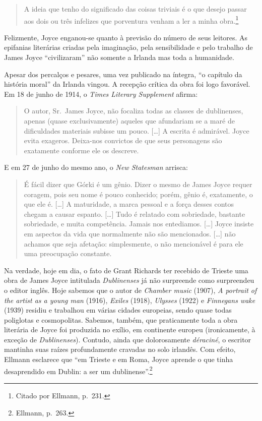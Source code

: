 \begin{quote}
A ideia que tenho do significado
das coisas triviais é o que desejo passar aos dois ou três infelizes que
porventura venham a ler a minha obra.\footnote{ Citado por Ellmann, p.~231.}
\end{quote}

Felizmente, Joyce enganou-se quanto à previsão do número de seus leitores. As
epifanias literárias criadas pela imaginação, pela sensibilidade e pelo
trabalho de James Joyce “civilizaram” não somente a Irlanda mas toda a
humanidade.

Apesar dos percalços e pesares, uma vez publicado na íntegra, “o capítulo da
história moral” da Irlanda vingou. A recepção crítica da obra foi logo
favorável.  Em 18 de junho de 1914, o \textit{Times Literary Supplement}
afirma:

\begin{quote}
O autor, Sr.~James Joyce, não focaliza todas as classes de dublinenses, apenas
(quase exclusivamente) aqueles que afundariam se a maré de dificuldades
materiais subisse um pouco. [\ldots{}] A escrita é admirável. Joyce evita exageros.
Deixa-nos convictos de que seus personagens são exatamente conforme ele os
descreve.
\end{quote}

E em 27 de junho do mesmo ano, o \textit{New Statesman} arrisca:

\begin{quote}
É fácil dizer que Górki é um gênio. Dizer o mesmo de James Joyce requer coragem,
pois seu nome é pouco conhecido; porém, gênio é, exatamente, o que ele é. [\ldots{}]
A maturidade, a marca pessoal e a força desses contos chegam a causar espanto.
[\ldots{}] Tudo é relatado com sobriedade, bastante sobriedade, e muita competência.
Jamais nos entediamos. [\ldots{}] Joyce insiste em aspectos da vida que normalmente
não são mencionados. [\ldots{}] não achamos que seja afetação: simplesmente, o não
mencionável é para ele uma preocupação constante.
\end{quote}

Na verdade, hoje em dia, o fato de Grant Richards ter recebido de Trieste uma
obra de James Joyce intitulada \textit{Dublinenses} já não surpreende como
surpreendeu o editor inglês. Hoje sabemos que o autor de \textit{Chamber music}
(1907), \textit{A portrait of the artist as a young man} (1916),
\textit{Exiles} (1918), \textit{Ulysses} (1922) e \textit{Finnegans wake}
(1939) residiu e trabalhou em várias cidades europeias, sendo quase todas
poliglotas e cosmopolitas. Sabemos, também, que praticamente toda a obra
literária de Joyce foi produzida no exílio, em continente europeu (ironicamente,
à exceção de \textit{Dublinenses}). Contudo, ainda que dolorosamente
\textit{déraciné}, o escritor mantinha suas raízes profundamente cravadas no
solo irlandês. Com efeito, Ellmann esclarece que “em Trieste e em Roma, Joyce
aprende o que tinha desaprendido em Dublin: a ser um dublinense”.\footnote{ Ellmann, p.~263.}


